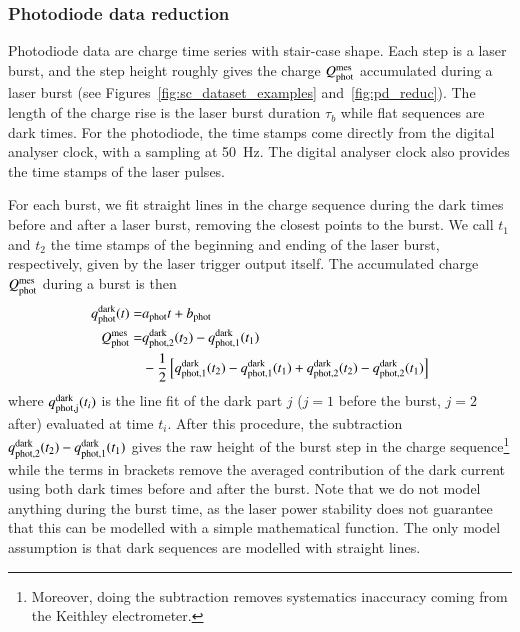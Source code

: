 \subsubsection{Photodiode data reduction}
\label{sec:pd_reduction}

Photodiode data are charge time series with stair-case shape. Each step is a laser burst, and the step height roughly gives the charge $Q_{\mathrm{phot}}^{\mathrm{mes}}$ accumulated during a laser burst (see Figures~\ref{fig:sc_dataset_examples} and~\ref{fig:pd_reduc}). The length of the charge rise is the laser burst duration $\tau_b$ while flat sequences are dark times. For the photodiode, the time stamps come directly from the digital analyser clock, with a sampling at \SI{50}{\hertz}. The digital analyser clock also provides the time stamps of the laser pulses. 

For each burst, we fit straight lines in the charge sequence during the dark times before and after a laser burst, removing the closest points to the burst. We call $t_1$ and $t_2$ the time stamps of the beginning and ending of the laser burst, respectively, given by the laser trigger output itself.%
The accumulated charge $Q_{\mathrm{phot}}^{\mathrm{mes}}$ during a burst is then
\begin{align}
q_{\rm phot}^{\rm dark}(t)  = & a_{\rm phot} t + b_{\rm phot} \\
Q_{\mathrm{phot}}^{\mathrm{mes}}  = & q_{\rm phot,2}^{\rm dark}(t_2) - q_{\rm phot,1}^{\rm dark}(t_1)\\ & - \frac{1}{2} \left[ q_{\rm phot,1}^{\rm dark}(t_2) -  q_{\rm phot,1}^{\rm dark}(t_1) + q_{\rm phot,2}^{\rm dark}(t_2) - q_{\rm phot,2}^{\rm dark}(t_1)  \right]   \notag 
\end{align}
where $q_{\rm phot,j}^{\rm dark}(t_i)$ is the line fit of the dark part $j$ ($j=1$ before the burst, $j=2$ after) evaluated at time $t_i$. After this procedure, the subtraction $q_{\rm phot,2}^{\rm dark}(t_2) - q_{\rm phot,1}^{\rm dark}(t_1)$ gives the raw height of the burst step in the charge sequence\footnote{Moreover, doing the subtraction removes systematics inaccuracy coming from the Keithley electrometer.} while the terms in brackets remove the averaged contribution of the dark current using both dark times before and after the burst. Note that we do not model anything during the burst time, as the laser power stability does not guarantee that this can be modelled with a simple mathematical function. The only model assumption is that dark sequences are modelled with straight lines.

